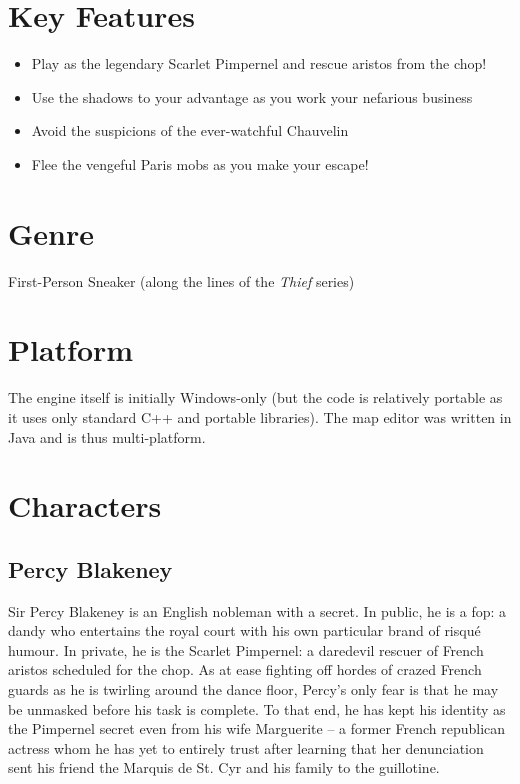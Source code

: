 \section{Key Features}

\begin{itemize}
\item Play as the legendary Scarlet Pimpernel and rescue aristos from the chop!
\item Use the shadows to your advantage as you work your nefarious business
\item Avoid the suspicions of the ever-watchful Chauvelin
\item Flee the vengeful Paris mobs as you make your escape!
\end{itemize}

\section{Genre}

First-Person Sneaker (along the lines of the \emph{Thief} series)

\section{Platform}

The engine itself is initially Windows-only (but the code is relatively portable as it uses only standard C++ and portable libraries). The map editor was written in Java and is thus multi-platform.

\section{Characters}

\subsection*{Percy Blakeney}

Sir Percy Blakeney is an English nobleman with a secret. In public, he is a fop: a dandy who entertains the royal court with his own particular brand of risqu\'e humour. In private, he is the Scarlet Pimpernel: a daredevil rescuer of French aristos scheduled for the chop. As at ease fighting off hordes of crazed French guards as he is twirling around the dance floor, Percy's only fear is that he may be unmasked before his task is complete. To that end, he has kept his identity as the Pimpernel secret even from his wife Marguerite -- a former French republican actress whom he has yet to entirely trust after learning that her denunciation sent his friend the Marquis de St. Cyr and his family to the guillotine.

